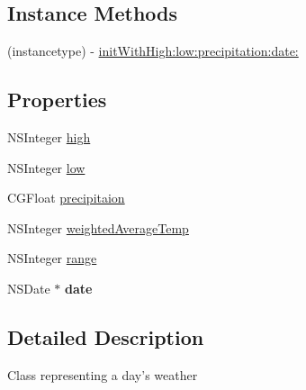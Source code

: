 \subsection*{Instance Methods}
\begin{DoxyCompactItemize}
\item 
(instancetype) -\/ \hyperlink{interface_weather_day_a5a57d195f2f06cb96693b4b4d68fd955}{init\-With\-High\-:low\-:precipitation\-:date\-:}
\end{DoxyCompactItemize}
\subsection*{Properties}
\begin{DoxyCompactItemize}
\item 
N\-S\-Integer \hyperlink{interface_weather_day_a97d5aad192216fe0de9ebc43296cfb68}{high}
\item 
N\-S\-Integer \hyperlink{interface_weather_day_a677798c5423dabd4861214c5de4faf55}{low}
\item 
C\-G\-Float \hyperlink{interface_weather_day_a62a56a8c78976523287185d6dce106e1}{precipitaion}
\item 
N\-S\-Integer \hyperlink{interface_weather_day_a8447b6e2f7cd73dce25e53ae8ac4baaa}{weighted\-Average\-Temp}
\item 
N\-S\-Integer \hyperlink{interface_weather_day_ade050fc16334cf7cac350d222ff1a026}{range}
\item 
\hypertarget{interface_weather_day_a0217f0a16223b343331a1831eecd97bb}{N\-S\-Date $\ast$ {\bfseries date}}\label{interface_weather_day_a0217f0a16223b343331a1831eecd97bb}

\end{DoxyCompactItemize}


\subsection{Detailed Description}
Class representing a day's weather 


